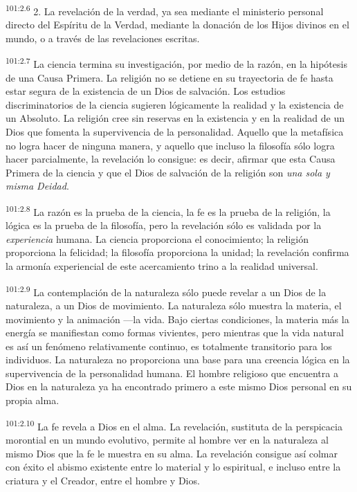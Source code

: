 \par
\textsuperscript{101:2.6} 2. La revelación de la verdad, ya sea mediante el ministerio personal directo del Espíritu de la Verdad, mediante la donación de los Hijos divinos en el mundo, o a través de las revelaciones escritas.

\par
\textsuperscript{101:2.7} La ciencia termina su investigación, por medio de la razón, en la hipótesis de una Causa Primera. La religión no se detiene en su trayectoria de fe hasta estar segura de la existencia de un Dios de salvación. Los estudios discriminatorios de la ciencia sugieren lógicamente la realidad y la existencia de un Absoluto. La religión cree sin reservas en la existencia y en la realidad de un Dios que fomenta la supervivencia de la personalidad. Aquello que la metafísica no logra hacer de ninguna manera, y aquello que incluso la filosofía sólo logra hacer parcialmente, la revelación lo consigue: es decir, afirmar que esta Causa Primera de la ciencia y que el Dios de salvación de la religión son \textit{una sola y misma Deidad}.

\par
\textsuperscript{101:2.8} La razón es la prueba de la ciencia, la fe es la prueba de la religión, la lógica es la prueba de la filosofía, pero la revelación sólo es validada por la \textit{experiencia} humana. La ciencia proporciona el conocimiento; la religión proporciona la felicidad; la filosofía proporciona la unidad; la revelación confirma la armonía experiencial de este acercamiento trino a la realidad universal.

\par
\textsuperscript{101:2.9} La contemplación de la naturaleza sólo puede revelar a un Dios de la naturaleza, a un Dios de movimiento. La naturaleza sólo muestra la materia, el movimiento y la animación ---la vida. Bajo ciertas condiciones, la materia más la energía se manifiestan como formas vivientes, pero mientras que la vida natural es así un fenómeno relativamente continuo, es totalmente transitorio para los individuos. La naturaleza no proporciona una base para una creencia lógica en la supervivencia de la personalidad humana. El hombre religioso que encuentra a Dios en la naturaleza ya ha encontrado primero a este mismo Dios personal en su propia alma.

\par
\textsuperscript{101:2.10} La fe revela a Dios en el alma. La revelación, sustituta de la perspicacia morontial en un mundo evolutivo, permite al hombre ver en la naturaleza al mismo Dios que la fe le muestra en su alma. La revelación consigue así colmar con éxito el abismo existente entre lo material y lo espiritual, e incluso entre la criatura y el Creador, entre el hombre y Dios.

